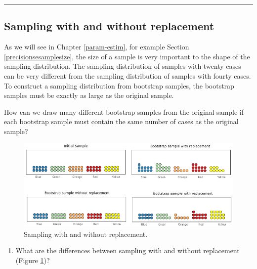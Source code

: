 \documentclass[a4paper]{book}
\providecommand{\tightlist}{%
  \setlength{\itemsep}{0pt}\setlength{\parskip}{0pt}}
\theoremstyle{definition}
\theoremstyle{definition}
\theoremstyle{definition}
\theoremstyle{remark}
\begin{document}
\begin{center}\rule{0.5\linewidth}{\linethickness}\end{center}

\subsection{Sampling with and without
replacement}\label{sampling-with-and-without-replacement}

As we will see in Chapter \ref{param-estim}, for example Section
\ref{precisionsesamplesize}, the size of a sample is very important to
the shape of the sampling distribution. The sampling distribution of
samples with twenty cases can be very different from the sampling
distribution of samples with fourty cases. To construct a sampling
distribution from bootstrap samples, the bootstrap samples must be
exactly as large as the original sample.

How can we draw many different bootstrap samples from the original
sample if each bootstrap sample must contain the same number of cases as
the original sample?

\begin{figure}[H]
\centering
\includegraphics{figures/replacement.png}
\caption{\label{fig:replacement}Sampling with and without replacement.}
\end{figure}

\begin{enumerate}
\def\labelenumi{\arabic{enumi}.}
\tightlist
\item
  What are the differences between sampling with and without replacement
  (Figure \ref{fig:replacement})?
\end{enumerate}
\end{document}
